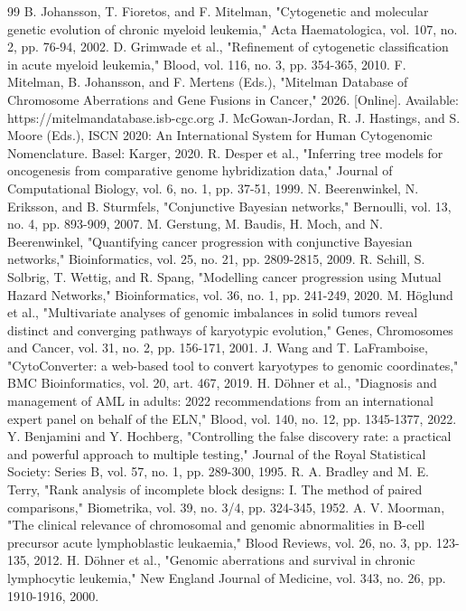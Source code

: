 \documentclass[conference]{IEEEtran}
\begin{document}
\begin{thebibliography}{99}
 B. Johansson, T. Fioretos, and F. Mitelman, "Cytogenetic and molecular genetic evolution of chronic myeloid leukemia," Acta Haematologica, vol. 107, no. 2, pp. 76-94, 2002.
 D. Grimwade et al., "Refinement of cytogenetic classification in acute myeloid leukemia," Blood, vol. 116, no. 3, pp. 354-365, 2010.
 F. Mitelman, B. Johansson, and F. Mertens (Eds.), "Mitelman Database of Chromosome Aberrations and Gene Fusions in Cancer," 2026. [Online]. Available: https://mitelmandatabase.isb-cgc.org
 J. McGowan-Jordan, R. J. Hastings, and S. Moore (Eds.), ISCN 2020: An International System for Human Cytogenomic Nomenclature. Basel: Karger, 2020.
 R. Desper et al., "Inferring tree models for oncogenesis from comparative genome hybridization data," Journal of Computational Biology, vol. 6, no. 1, pp. 37-51, 1999.
 N. Beerenwinkel, N. Eriksson, and B. Sturmfels, "Conjunctive Bayesian networks," Bernoulli, vol. 13, no. 4, pp. 893-909, 2007.
 M. Gerstung, M. Baudis, H. Moch, and N. Beerenwinkel, "Quantifying cancer progression with conjunctive Bayesian networks," Bioinformatics, vol. 25, no. 21, pp. 2809-2815, 2009.
 R. Schill, S. Solbrig, T. Wettig, and R. Spang, "Modelling cancer progression using Mutual Hazard Networks," Bioinformatics, vol. 36, no. 1, pp. 241-249, 2020.
 M. Höglund et al., "Multivariate analyses of genomic imbalances in solid tumors reveal distinct and converging pathways of karyotypic evolution," Genes, Chromosomes and Cancer, vol. 31, no. 2, pp. 156-171, 2001.
 J. Wang and T. LaFramboise, "CytoConverter: a web-based tool to convert karyotypes to genomic coordinates," BMC Bioinformatics, vol. 20, art. 467, 2019.
 H. Döhner et al., "Diagnosis and management of AML in adults: 2022 recommendations from an international expert panel on behalf of the ELN," Blood, vol. 140, no. 12, pp. 1345-1377, 2022.
 Y. Benjamini and Y. Hochberg, "Controlling the false discovery rate: a practical and powerful approach to multiple testing," Journal of the Royal Statistical Society: Series B, vol. 57, no. 1, pp. 289-300, 1995.
 R. A. Bradley and M. E. Terry, "Rank analysis of incomplete block designs: I. The method of paired comparisons," Biometrika, vol. 39, no. 3/4, pp. 324-345, 1952.
 A. V. Moorman, "The clinical relevance of chromosomal and genomic abnormalities in B-cell precursor acute lymphoblastic leukaemia," Blood Reviews, vol. 26, no. 3, pp. 123-135, 2012.
 H. Döhner et al., "Genomic aberrations and survival in chronic lymphocytic leukemia," New England Journal of Medicine, vol. 343, no. 26, pp. 1910-1916, 2000.
\end{thebibliography}
\end{document}
